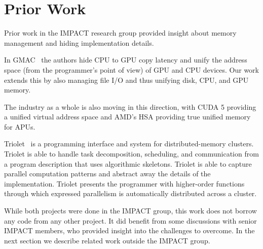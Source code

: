 \section{Prior Work}

Prior work in the IMPACT research group provided insight about memory
management and hiding implementation details.

In GMAC~\cite{gmac} the authors hide CPU
	to GPU copy latency and unify the 
	address space (from the programmer's point of view)
	of GPU and CPU devices. 
Our work extends this by also managing file I/O and thus
	unifying disk, CPU, and GPU memory.

The industry as a whole is also moving in this direction, with CUDA 5 providing
a unified virtual address space and AMD's HSA providing true unified
memory for APUs.

Triolet~\cite{rodrigues2014triolet} is a programming interface and system for
distributed-memory clusters. Triolet is able to handle
task decomposition, scheduling, and communication from a program description
that uses algorithmic skeletons. Triolet is able to capture parallel
computation patterns and abstract away the details of the implementation.
Triolet presents the programmer with higher-order functions through which
expressed parallelism is automatically distributed across a cluster.

While both projects were done in the IMPACT group, this work does
	not borrow any code from any other project. It did benefit from some
discussions with senior IMPACT members, who provided insight into the challenges to overcome.
In the next section we describe related work outside the IMPACT group.

